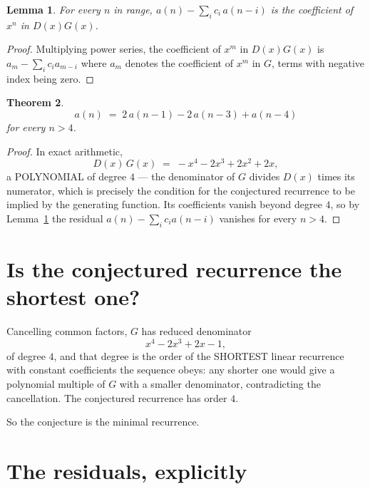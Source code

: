 \documentclass[11pt,a4paper]{article}
\theoremstyle{plain}
\newtheorem{theorem}{Theorem}
\newtheorem{lemma}[theorem]{Lemma}
\theoremstyle{definition}
\begin{document}
\begin{lemma}\label{lem:key}
For every $n$ in range, $a(n)-\sum_i c_i\,a(n-i)$ is the coefficient of $x^{n}$ in
$D(x)G(x)$.
\end{lemma}

\begin{proof}
Multiplying power series, the coefficient of $x^{m}$ in $D(x)G(x)$ is
$a_m-\sum_i c_i a_{m-i}$ where $a_m$ denotes the coefficient of $x^{m}$ in $G$, terms with
negative index being zero.
\end{proof}

\begin{theorem}
\[
a(n)\;=\;2\,a(n-1) - 2\,a(n-3) + a(n-4)
\]
for every $n>4$.
\end{theorem}

\begin{proof}
In exact arithmetic,
\[
D(x)\,G(x)\;=\;- x^{4} - 2 x^{3} + 2 x^{2} + 2 x,
\]
a POLYNOMIAL of degree $4$ --- the denominator of $G$ divides $D(x)$ times its numerator,
which is precisely the condition for the conjectured recurrence to be implied by the
generating function. Its coefficients vanish beyond degree $4$, so by
Lemma~\ref{lem:key} the residual $a(n)-\sum_ic_ia(n-i)$ vanishes for every
$n>4$.
\end{proof}

\section{Is the conjectured recurrence the shortest one?}

Cancelling common factors, $G$ has reduced denominator
\[
x^{4} - 2 x^{3} + 2 x - 1,
\]
of degree $4$, and that degree is the order of the SHORTEST linear recurrence with
constant coefficients the sequence obeys: any shorter one would give a polynomial multiple of
$G$ with a smaller denominator, contradicting the cancellation. The conjectured recurrence has
order $4$.

So the conjecture is the minimal recurrence.

\section{The residuals, explicitly}
\end{document}
